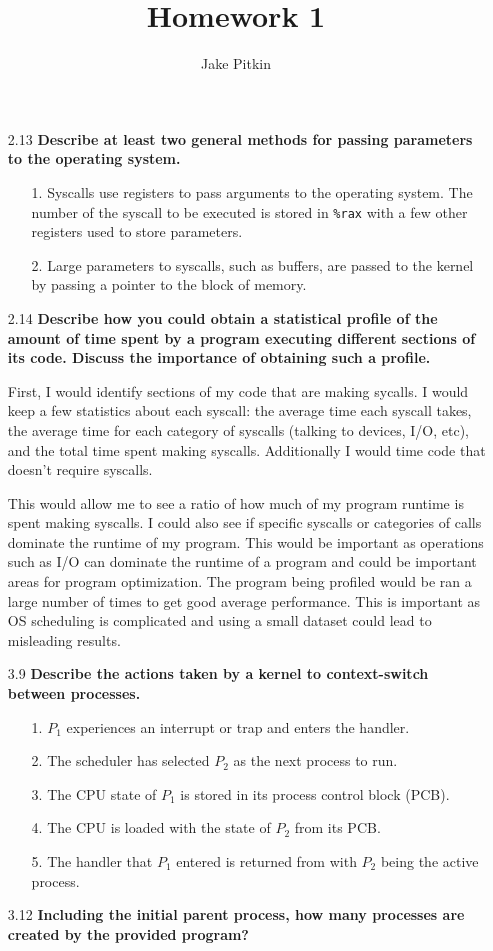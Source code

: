\documentclass[11pt, letterpaper]{hw}
\title{Homework 1}
\institute{University of Utah}
\author{Jake Pitkin}
\begin{document}
\maketitle

\begin{enumerate}

\item [2.13] \textbf{Describe at least two general methods for passing parameters to the operating system.}
\begin{enumerate}
\item [1.] Syscalls use registers to pass arguments to the operating system. The number of the syscall to be executed is stored in \texttt{\%rax} with a few other registers used to store parameters.
\item [2.] Large parameters to syscalls, such as buffers, are passed to the kernel by passing a pointer to the block of memory.
\end{enumerate}

\item [2.14] \textbf{Describe how you could obtain a statistical profile of the amount of time spent by a program executing different sections of its code. Discuss the importance of obtaining such a profile.}

First, I would identify sections of my code that are making sycalls. I would keep a few statistics about each syscall: the average time each syscall takes, the average time for each category of syscalls (talking to devices, I/O, etc), and the total time spent making syscalls. Additionally I would time code that doesn't require syscalls.

This would allow me to see a ratio of how much of my program runtime is spent making syscalls. I could also see if specific syscalls or categories of calls dominate the runtime of my program. This would be important as operations such as I/O can dominate the runtime of a program and could be important areas for program optimization. The program being profiled would be ran a large number of times to get good average performance. This is important as OS scheduling is complicated and using a small dataset could lead to misleading results.

\item [3.9] \textbf{Describe the actions taken by a kernel to context-switch between processes.}
\begin{enumerate}
\item [1.] $P_1$ experiences an interrupt or trap and enters the handler.
\item [2.] The scheduler has selected $P_2$ as the next process to run.
\item [3.] The CPU state of $P_1$ is stored in its process control block (PCB).
\item [4.] The CPU is loaded with the state of $P_2$ from its PCB.
\item [5.] The handler that $P_1$ entered is returned from with $P_2$ being the active process.
\end{enumerate}
\item [3.12] \textbf{Including the initial parent process, how many processes are created by the provided program?}


\end{enumerate}
\end{document}
